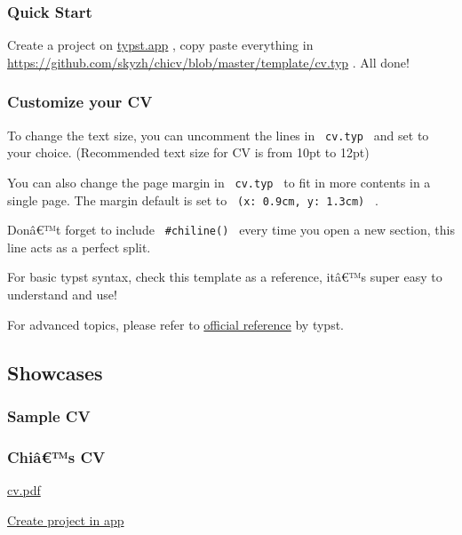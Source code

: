 \subsubsection{Quick Start}\label{quick-start}

Create a project on \href{https://typst.app/}{typst.app} , copy paste
everything in
\url{https://github.com/skyzh/chicv/blob/master/template/cv.typ} . All
done!

\subsubsection{Customize your CV}\label{customize-your-cv}

To change the text size, you can uncomment the lines in
\texttt{\ cv.typ\ } and set to your choice. (Recommended text size for
CV is from 10pt to 12pt)

You can also change the page margin in \texttt{\ cv.typ\ } to fit in
more contents in a single page. The margin default is set to
\texttt{\ (x:\ 0.9cm,\ y:\ 1.3cm)\ } .

Donâ€™t forget to include \texttt{\ \#chiline()\ } every time you open a
new section, this line acts as a perfect split.

For basic typst syntax, check this template as a reference, itâ€™s super
easy to understand and use!

For advanced topics, please refer to
\href{https://typst.app/docs/reference/}{official reference} by typst.

\subsection{Showcases}\label{showcases}

\subsubsection{Sample CV}\label{sample-cv}


\subsubsection{Chiâ€™s CV}\label{chiuxe2s-cv}

\href{https://skyzh.github.io/files/cv.pdf}{cv.pdf}

\href{/app?template=chicv&version=0.1.0}{Create project in app}

